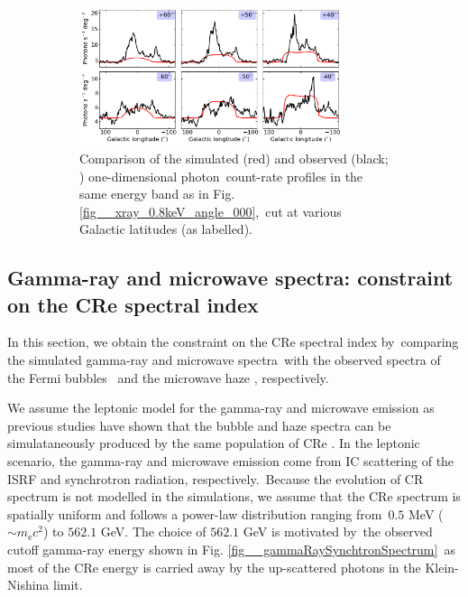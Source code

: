 \documentclass[fleqn,usenatbib,useAMS]{mnras}
\begin{document}
\begin{figure}
      \begin{subfigure}[t]{\textwidth}%
         \centering%
         \includegraphics[width=0.85\textwidth]{figures/fig__xray-profile-0.8keV-000.png}%
         \caption{
               Comparison of the simulated (red) and observed (black; \citealt{Predehl2020}) one-dimensional photon\
               count-rate profiles in the same energy band as in Fig. \ref{fig__xray_0.8keV_angle_000},\
               cut at various Galactic latitudes (as labelled).
         }%
         \label{fig__x-ray-profile-0.8keV-000}%
      \end{subfigure}%
      \caption{}%
      \label{fig_xray-map}
 \end{figure}%



\subsection{Gamma-ray and microwave spectra: constraint on the CRe spectral index}
\label{sec:gamma-ray-microwave}
In this section, we obtain the constraint on the CRe spectral index by\
comparing the simulated gamma-ray and microwave spectra\
with the observed spectra of the Fermi bubbles \citep{Ackermann2014}\
and the microwave haze \citep{Dobler_2008}, respectively.\

We assume the leptonic model for the gamma-ray and microwave emission as previous studies have shown that the bubble and haze spectra can be simulataneously produced by the same population of CRe \citep{Su2010, Ackermann2014, Yang2022}. In the leptonic scenario, the gamma-ray and microwave emission come from IC scattering of the ISRF and synchrotron radiation, respectively.\
Because the evolution of CR spectrum is not modelled in the simulations, we assume that the CRe spectrum is spatially uniform and follows a power-law distribution ranging from\
$0.5$ MeV ($\sim m_{\text{e}}c^2$) to $562.1$ GeV. The choice of $562.1$ GeV is motivated by\
the observed cutoff gamma-ray energy shown in Fig. \ref{fig__gammaRaySynchtronSpectrum}\
as most of the CRe energy is carried away by the up-scattered photons in the Klein-Nishina limit.
\end{document}

